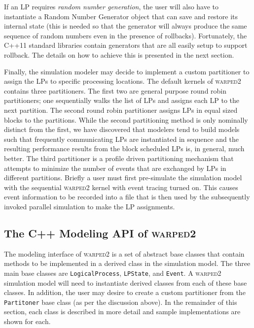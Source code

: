 \documentclass[11pt]{book}
\begin{document}
If an LP requires \emph{random number generation}, the user will also have to instantiate a Random
Number Generator object that can save and restore its internal state (this is needed so that the
generator will always produce the same sequence of random numbers even in the presence of
rollbacks).  Fortunately, the C++11 standard libraries contain generators that are all easily setup
to support rollback.  The details on how to achieve this is presented in the next section.

Finally, the simulation modeler may decide to implement a custom partitioner to assign the LPs to
specific processing locations.  The default kernels of \textsc{warped2} contains three partitioners.
The first two are general purpose round robin partitioners; one sequentially walks the list of LPs
and assigns each LP to the next partition.  The second round robin partitioner assigns LPs in equal
sized blocks to the partitions.  While the second partitioning method is only nominally distinct
from the first, we have discovered that modelers tend to build models such that frequently
communicating LPs are instantiated in sequence and the resulting performance results from the block
scheduled LPs is, in general, much better.  The third partitioner is a profile driven partitioning
mechanism that attempts to minimize the number of events that are exchanged by LPs in different
partitions.  Briefly a user must first pre-simulate the simulation model with the sequential
\textsc{warped2} kernel with event tracing turned on.  This causes event information to be recorded
into a file that is then used by the subsequently invoked parallel simulation to make the LP
assignments.

\subsection{The C++ Modeling API of \textsc{warped2}}

The modeling interface of \textsc{warped2} is a set of abstract base classes that contain methods to
be implemented in a derived class in the simulation model.  The three main base classes are
\texttt{LogicalProcess}, \texttt{LPState}, and \texttt{Event}.  A \textsc{warped2} simulation model
will need to instantiate derived classes from each of these base classes.  In addition, the user may
desire to create a custom partitioner from the \texttt{Partitoner} base class (as per the discussion
above).  In the remainder of this section, each class is described in more detail and sample
implementations are shown for each.
\end{document}
